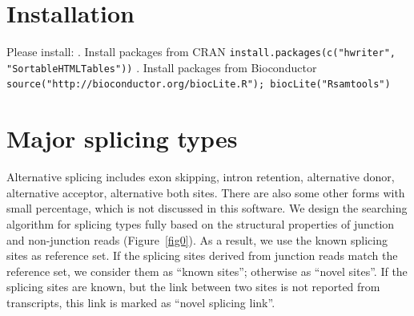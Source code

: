 \documentclass[a4paper]{article}
\begin{document}
\section{Installation}
Please install:
\newline {}. Install packages from CRAN \newline
    \texttt{install.packages(c("hwriter", "SortableHTMLTables"))} \newline {}. Install packages from Bioconductor \newline
   \texttt{source("http://bioconductor.org/biocLite.R"); biocLite("Rsamtools")} \newline

\section{Major splicing types}
Alternative splicing includes exon skipping, intron retention, 
alternative donor, alternative acceptor, alternative both sites. 
There are also some other forms with small percentage, which is not discussed 
in this software. We design the searching algorithm for splicing types fully based on the structural
properties of junction and non-junction reads (Figure~\ref{fig0}). As a result, we use the known 
splicing sites as reference set. If the splicing sites derived from junction 
reads match the reference set, we consider them as ``known sites''; 
otherwise as ``novel sites''.  If the splicing sites are known, but the link 
between two sites is not reported from transcripts, this link is marked 
as ``novel splicing link''. 
\end{document}
